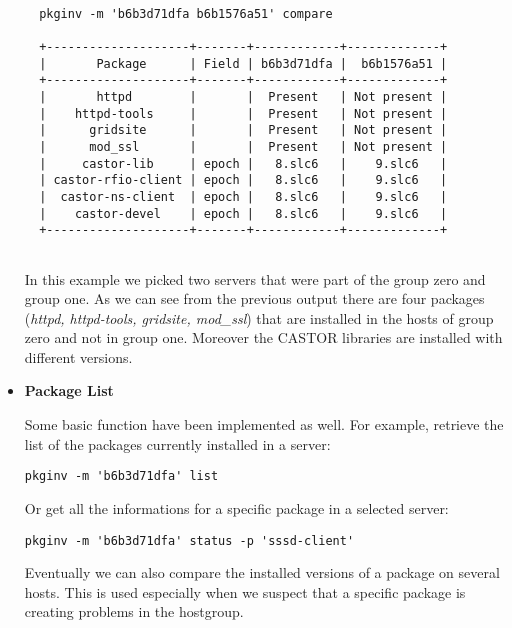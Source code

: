 \begin{itemize}
  \begin{lstlisting}[frame=single]
  
  pkginv -m 'b6b3d71dfa b6b1576a51' compare

  +--------------------+-------+------------+-------------+
  |       Package      | Field | b6b3d71dfa |  b6b1576a51 |
  +--------------------+-------+------------+-------------+
  |       httpd        |       |  Present   | Not present |
  |    httpd-tools     |       |  Present   | Not present |
  |      gridsite      |       |  Present   | Not present |
  |      mod_ssl       |       |  Present   | Not present |
  |     castor-lib     | epoch |   8.slc6   |    9.slc6   |
  | castor-rfio-client | epoch |   8.slc6   |    9.slc6   |
  |  castor-ns-client  | epoch |   8.slc6   |    9.slc6   |
  |    castor-devel    | epoch |   8.slc6   |    9.slc6   |
  +--------------------+-------+------------+-------------+
  
  \end{lstlisting}

  In this example we picked two servers that were part of the group zero
  and group one. As we can see from the previous output there are four
  packages (\textit{httpd, httpd-tools, gridsite, mod\_ssl}) that are
  installed in the hosts of group zero and not in group one. Moreover the
  CASTOR \cite{castor} libraries are installed with different versions.

  \item \textbf{Package List}

  Some basic function have been implemented as well. For example, retrieve
  the list of the packages currently installed in a server: \newline{}

  \begin{lstlisting}[frame=single]
  pkginv -m 'b6b3d71dfa' list
  \end{lstlisting}
  
  Or get all the informations for a specific package in a selected server:
  \newline{}
  
  \begin{lstlisting}[frame=single]
  pkginv -m 'b6b3d71dfa' status -p 'sssd-client'
  \end{lstlisting}
 
  Eventually we can also compare the installed versions of a package on
  several hosts. This is used especially when we suspect that a specific
  package is creating problems in the hostgroup. \newline{}
  

\end{itemize}
